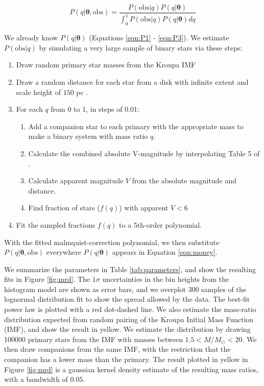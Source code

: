 \documentclass{emulateapj}
\renewcommand{\vec}[1]{\bm{#1}}
\begin{document}
\begin{equation}
P(q|\vec{\theta}, \mathrm{obs}) = \frac{P(\mathrm{obs}|q) P(q|\vec{\theta})}{\int_0^1 P(\mathrm{obs}|q) P(q|\vec{\theta}) dq}
\end{equation}

We already know $P(q|\vec{\theta})$ (Equations \ref{eqn:P1} - \ref{eqn:P3}). We estimate $P(\mathrm{obs}|q)$ by simulating a very large sample of binary stars via these steps:

\begin{enumerate}
\item Draw random primary star masses from the Kroupa IMF \citep{Kroupa2002}
\item Draw a random distance for each star from a disk with infinite extent and scale height of $150$ pc \citep[the approximate scale height of the Milky Way disk for A-type stars,][]{BM1998}. 
\item For each $q$ from 0 to 1, in steps of 0.01:
\begin{enumerate}
  \item Add a companion star to each primary with the appropriate mass to make a binary system with mass ratio $q$.
  \item Calculate the combined absolute V-magnitude by interpolating Table 5 of \citet{Pecaut2013}.
  \item Calculate apparent magnitude $V$ from the absolute magnitude and distance.
  \item Find fraction of stars ($f(q)$) with apparent $V < 6$
\end{enumerate}
\item Fit the sampled fractions $f(q)$ to a 5th-order polynomial.
\end{enumerate}

With the fitted malmquist-correction polynomial, we then substitute $P(q|\vec{\theta}, \mathrm{obs})$ everywhere $P(q|\vec{\theta})$ appears in Equation \ref{eqn:money}.

We summarize the parameters in Table \ref{tab:parameters}, and show the resulting fits in Figure \ref{fig:mrd}. The $1\sigma$ uncertainties in the bin heights from the histogram model are shown as error bars, and we overplot 300 samples of the lognormal distribution fit to show the spread allowed by the data. The best-fit power law is plotted with a red dot-dashed line. We also estimate the mass-ratio distribution expected from random pairing of the Kroupa Initial Mass Function (IMF), and show the result in yellow. We estimate the distribution by drawing 100000 primary stars from the IMF with masses between $1.5 < M/M_{\odot} < 20$. We then draw companions from the same IMF, with the restriction that the companion has a lower mass than the primary. The result plotted in yellow in Figure \ref{fig:mrd} is a gaussian kernel density estimate of the resulting mass ratios, with a bandwidth of $0.05$.
\end{document}
